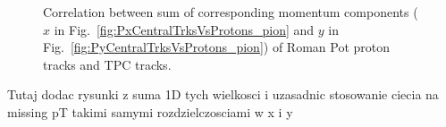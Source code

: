 \begin{figure}[ht!]
\centering
\parbox{0.4725\textwidth}{
  \centering
  \begin{subfigure}[b]{\linewidth}{
                }
  \end{subfigure}
}
\quad
\parbox{0.4725\textwidth}{
  \centering
  \begin{subfigure}[b]{\linewidth}{
                }
  \end{subfigure}
}%
\caption{Correlation between sum of corresponding momentum components ($x$ in Fig.~\ref{fig:PxCentralTrksVsProtons_pion} and $y$ in Fig.~\ref{fig:PyCentralTrksVsProtons_pion}) of Roman Pot proton tracks and TPC tracks.}
\end{figure}
Tutaj dodac rysunki z suma 1D tych wielkosci i uzasadnic stosowanie ciecia na missing pT takimi samymi rozdzielczosciami w x i y


